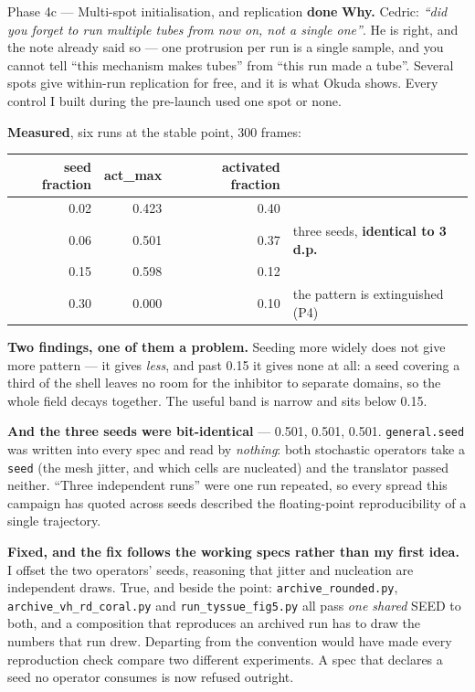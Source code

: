 \documentclass[11pt,a4paper]{article}
\newcommand{\code}[1]{\texttt{#1}}
\newcommand{\dn}{\textcolor{good}{\textbf{done}}}
\begin{document}
\begin{phasebox}{Phase 4c --- Multi-spot initialisation, and replication \hfill \dn}
\textbf{Why.} Cedric: \emph{``did you forget to run multiple tubes from now on, not a single
one''}. He is right, and the note already said so --- one protrusion per run is a single sample,
and you cannot tell ``this mechanism makes tubes'' from ``this run made a tube''. Several spots
give within-run replication for free, and it is what Okuda shows. Every control I built during
the pre-launch used one spot or none.

\textbf{Measured}, six runs at the stable point, 300 frames:

\begin{center}\small
\begin{tabular}{@{}r r r l@{}}
\toprule
\textbf{seed fraction} & \textbf{act\_max} & \textbf{activated fraction} & \\
\midrule
0.02 & 0.423 & 0.40 & \\
0.06 & 0.501 & 0.37 & three seeds, \textbf{identical to 3 d.p.}\\
0.15 & 0.598 & 0.12 & \\
0.30 & \textcolor{bad}{0.000} & 0.10 & the pattern is extinguished (P4)\\
\bottomrule
\end{tabular}
\end{center}

\textbf{Two findings, one of them a problem.} Seeding more widely does not give more pattern --- it
gives \emph{less}, and past 0.15 it gives none at all: a seed covering a third of the shell leaves
no room for the inhibitor to separate domains, so the whole field decays together. The useful band
is narrow and sits below 0.15.

\textbf{And the three seeds were bit-identical} --- 0.501, 0.501, 0.501. \code{general.seed} was
written into every spec and read by \emph{nothing}: both stochastic operators take a \code{seed}
(the mesh jitter, and which cells are nucleated) and the translator passed neither. ``Three
independent runs'' were one run repeated, so every spread this campaign has quoted across seeds
described the floating-point reproducibility of a single trajectory.

\textbf{Fixed, and the fix follows the working specs rather than my first idea.} I offset the two
operators' seeds, reasoning that jitter and nucleation are independent draws. True, and beside the
point: \code{archive\_rounded.py}, \code{archive\_vh\_rd\_coral.py} and \code{run\_tyssue\_fig5.py}
all pass \emph{one shared} SEED to both, and a composition that reproduces an archived run has to
draw the numbers that run drew. Departing from the convention would have made every reproduction
check compare two different experiments. A spec that declares a seed no operator consumes is now
refused outright.


\end{phasebox}
\end{document}
